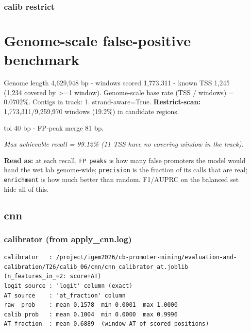 \documentclass[10pt]{article}
\begin{document}
\subsubsection*{calib \textperiodcentered{} restrict}
\section*{Genome-scale false-positive benchmark}

Genome length 4,629,948 bp - windows scored 1,773,311 - known TSS 1,245 (1,234 covered by >=1 window). Genome-scale base rate (TSS / windows) = 0.0702\%. Contigs in track: 1. strand-aware=True. \textbf{Restrict-scan:} 1,773,311/9,259,970 windows (19.2\%) in candidate regions.

tol 40 bp - FP-peak merge 81 bp.

\begin{center}
\end{center}

{\itshape Max achievable recall = 99.12\% (11 TSS have no covering window in the track).}

\textbf{Read as:} at each recall, \texttt{FP peaks} is how many false promoters the model would hand the wet lab genome-wide; \texttt{precision} is the fraction of its calls that are real; \texttt{enrichment} is how much better than random. F1/AUPRC on the balanced set hide all of this.

\subsection*{cnn}

\subsubsection*{calibrator (from apply\_cnn.log)}
\begin{verbatim}
calibrator   : /project/igem2026/cb-promoter-mining/evaluation-and-calibration/T26/calib_06/cnn/cnn_calibrator_at.joblib  (n_features_in_=2: score+AT)
logit source : 'logit' column (exact)
AT source    : 'at_fraction' column
raw  prob    : mean 0.1578  min 0.0001  max 1.0000
calib prob   : mean 0.1004  min 0.0000  max 0.9996
AT fraction  : mean 0.6889  (window AT of scored positions)
\end{verbatim}
\end{document}

